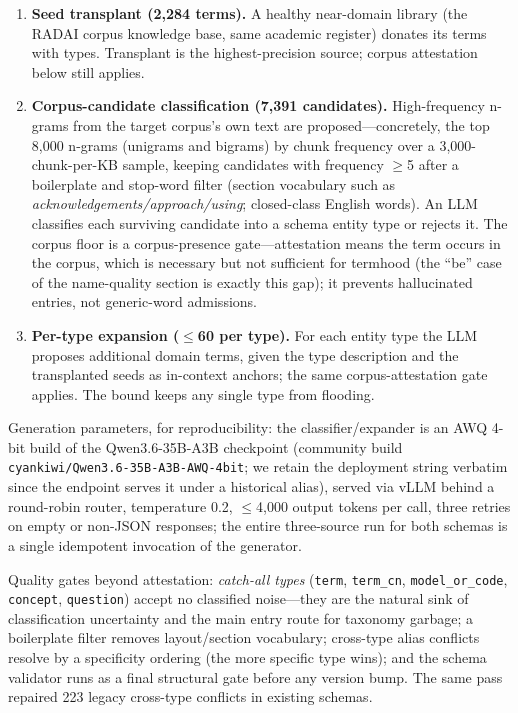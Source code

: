 \documentclass[preprint,12pt]{elsarticle}
\begin{document}
\begin{enumerate}
\item \textbf{Seed transplant (2{,}284 terms).} A healthy near-domain
library (the RADAI corpus knowledge base, same academic register) donates
its terms with types. Transplant is the highest-precision source; corpus
attestation below still applies.
\item \textbf{Corpus-candidate classification (7{,}391 candidates).}
High-frequency n-grams from the target corpus's own text are
proposed---concretely, the top 8{,}000 n-grams (unigrams and bigrams) by
chunk frequency over a 3{,}000-chunk-per-KB sample, keeping candidates with
frequency $\geq$5 after a boilerplate and stop-word filter (section
vocabulary such as \emph{acknowledgements/approach/using}; closed-class
English words). An LLM classifies each surviving candidate into a schema
entity type or rejects it. The corpus
floor is a corpus-presence gate---attestation means the term occurs in
the corpus, which is necessary but not sufficient for termhood (the
``be'' case of the name-quality section is exactly this gap); it
prevents hallucinated entries, not generic-word admissions.
\item \textbf{Per-type expansion ($\leq$60 per type).} For each entity type
the LLM proposes additional domain terms, given the type description and
the transplanted seeds as in-context anchors; the same corpus-attestation
gate applies. The bound keeps any single type from flooding.
\end{enumerate}

Generation parameters, for reproducibility: the classifier/expander is
an AWQ 4-bit build of the Qwen3.6-35B-A3B checkpoint (community build
\texttt{cyankiwi/Qwen3.6-35B-A3B-AWQ-4bit}; we retain the deployment
string verbatim since the endpoint serves it under a historical alias),
served via vLLM behind a round-robin router, temperature 0.2,
$\leq$4{,}000 output tokens per call, three retries on empty or non-JSON
responses; the entire three-source run for both schemas is a single
idempotent invocation of the generator.

Quality gates beyond attestation: \emph{catch-all types}
(\texttt{term}, \texttt{term\_cn}, \texttt{model\_or\_code},
\texttt{concept}, \texttt{question}) accept no classified noise---they are
the natural sink of classification uncertainty and the main entry route for
taxonomy garbage; a boilerplate filter removes layout/section vocabulary;
cross-type alias conflicts resolve by a specificity ordering (the more
specific type wins); and the schema validator runs as a final structural
gate before any version bump. The same pass repaired 223 legacy cross-type
conflicts in existing schemas.
\end{document}
